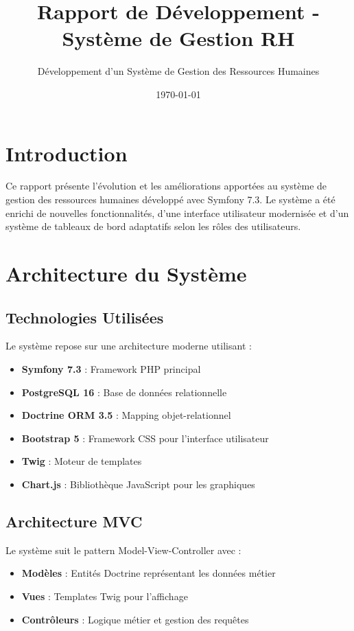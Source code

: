 \documentclass[12pt,a4paper]{article}
\title{\textbf{Rapport de Développement - Système de Gestion RH}}
\author{Développement d'un Système de Gestion des Ressources Humaines}
\date{\today}
\begin{document}
\maketitle

\tableofcontents
\newpage

\section{Introduction}

Ce rapport présente l'évolution et les améliorations apportées au système de gestion des ressources humaines développé avec Symfony 7.3. Le système a été enrichi de nouvelles fonctionnalités, d'une interface utilisateur modernisée et d'un système de tableaux de bord adaptatifs selon les rôles des utilisateurs.

\section{Architecture du Système}

\subsection{Technologies Utilisées}
Le système repose sur une architecture moderne utilisant :
\begin{itemize}
    \item \textbf{Symfony 7.3} : Framework PHP principal
    \item \textbf{PostgreSQL 16} : Base de données relationnelle
    \item \textbf{Doctrine ORM 3.5} : Mapping objet-relationnel
    \item \textbf{Bootstrap 5} : Framework CSS pour l'interface utilisateur
    \item \textbf{Twig} : Moteur de templates
    \item \textbf{Chart.js} : Bibliothèque JavaScript pour les graphiques
\end{itemize}

\subsection{Architecture MVC}
Le système suit le pattern Model-View-Controller avec :
\begin{itemize}
    \item \textbf{Modèles} : Entités Doctrine représentant les données métier
    \item \textbf{Vues} : Templates Twig pour l'affichage
    \item \textbf{Contrôleurs} : Logique métier et gestion des requêtes
\end{itemize}
\end{document}
